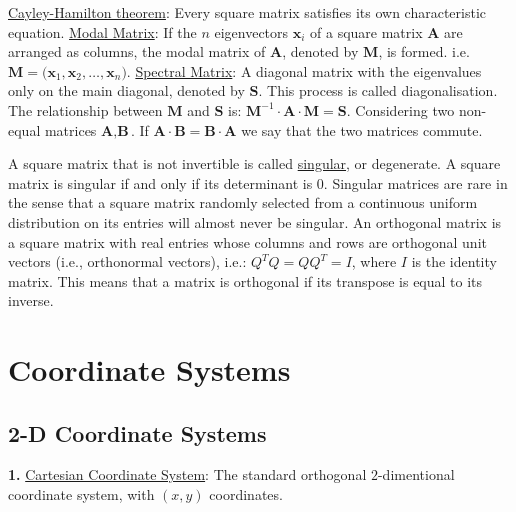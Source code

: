 \documentclass[12pt]{article}
\begin{document}
\begin{flushleft}
	\textbullet \quad \uline{Cayley-Hamilton theorem}: Every square matrix satisfies its own characteristic equation. \linebreak 
	\textbullet \quad \uline{Modal Matrix}: If the $n$ eigenvectors $\textbf{x} _i$ of a square matrix $\textbf{A}$ are arranged as columns, the modal matrix of $\textbf{A}$, denoted by $\textbf{M}$, is formed. i.e. $\displaystyle \textbf{M} = \big( \textbf{x} _1, \textbf{x} _2, \ldots, \textbf{x} _n \big) $. \linebreak 
	\textbullet \quad \uline{Spectral Matrix}: A diagonal matrix with the eigenvalues only on the main diagonal, denoted by $\textbf{S}$. This process is called diagonalisation. \linebreak 
	\textbullet \quad The relationship between $\displaystyle  \textbf{M}$ and $\textbf{S}$ is: $\textbf{M}^{-1} \cdot \textbf{A} \cdot \textbf{M} = \textbf{S}$. \linebreak 
	\textbullet \quad Considering two non-equal matrices $\displaystyle \textbf{A}, \textbf{B}$. If $\textbf{A}\cdot \textbf{B} = \textbf{B} \cdot \textbf{A} $ we say that the two matrices commute. \linebreak 	
	
	\textbullet \quad A square matrix that is not invertible is called \uline{singular}, or degenerate. A square matrix is singular if and only if its determinant is $0$. Singular matrices are rare in the sense that a square matrix randomly selected from a continuous uniform distribution on its entries will almost never be singular. \linebreak 
	\textbullet \quad An orthogonal matrix is a square matrix with real entries whose columns and rows are orthogonal unit vectors (i.e., orthonormal vectors), i.e.: $ \displaystyle Q^T Q = Q Q^T = I $, where $I$ is the identity matrix. This means that a matrix is orthogonal if its transpose is equal to its inverse. \linebreak 
	
	
	\pagebreak
	
	
	\section{Coordinate Systems}
	
	\subsection{2-D Coordinate Systems}	
	
	\textbf{1.} \uline{Cartesian Coordinate System}:	The standard orthogonal $2$-dimentional coordinate system, with $(x,y)$ coordinates. \linebreak 
	

\end{flushleft}
\end{document}
